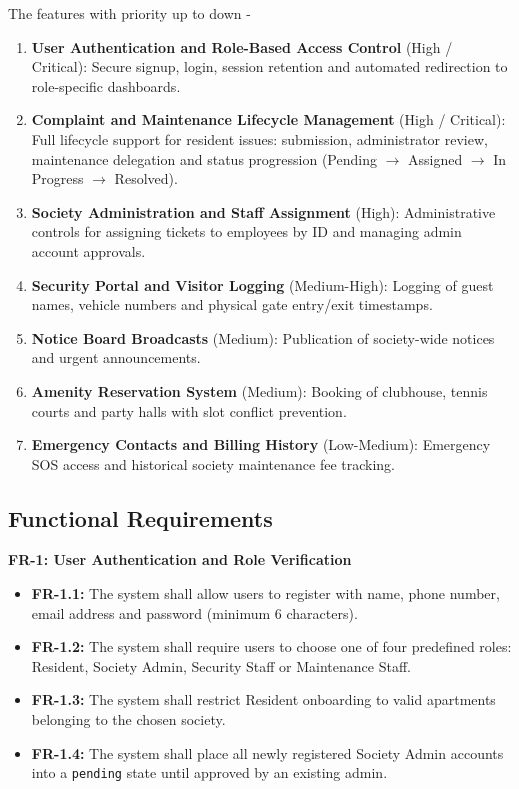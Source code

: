 \documentclass[a4paper,10pt]{scrartcl}
\numberwithin{figure}{section}
\newcommand{\code}[1]{\texttt{\renewcommand{\_}{\textunderscore\hspace{0pt}}#1}}
\begin{document}
The features with priority up to down -
\begin{enumerate}
\item \textbf{User Authentication and Role-Based Access Control} (High / Critical): Secure signup, login, session retention and automated redirection to role-specific dashboards.
\item \textbf{Complaint and Maintenance Lifecycle Management} (High / Critical): Full lifecycle support for resident issues: submission, administrator review, maintenance delegation and status progression (Pending $\rightarrow$ Assigned $\rightarrow$ In Progress $\rightarrow$ Resolved).
\item \textbf{Society Administration and Staff Assignment} (High): Administrative controls for assigning tickets to employees by ID and managing admin account approvals.
\item \textbf{Security Portal and Visitor Logging} (Medium-High): Logging of guest names, vehicle numbers and physical gate entry/exit timestamps.
\item \textbf{Notice Board Broadcasts} (Medium): Publication of society-wide notices and urgent announcements.
\item \textbf{Amenity Reservation System} (Medium): Booking of clubhouse, tennis courts and party halls with slot conflict prevention.
\item \textbf{Emergency Contacts and Billing History} (Low-Medium): Emergency SOS access and historical society maintenance fee tracking.
\end{enumerate}

\subsection{Functional Requirements}
\textbf{FR-1: User Authentication and Role Verification}
\begin{itemize}
\item \textbf{FR-1.1:} The system shall allow users to register with name, phone number, email address and password (minimum 6 characters).
\item \textbf{FR-1.2:} The system shall require users to choose one of four predefined roles: Resident, Society Admin, Security Staff or Maintenance Staff.
\item \textbf{FR-1.3:} The system shall restrict Resident onboarding to valid apartments belonging to the chosen society.
\item \textbf{FR-1.4:} The system shall place all newly registered Society Admin accounts into a \code{pending} state until approved by an existing admin.
\end{itemize}
\end{document}
